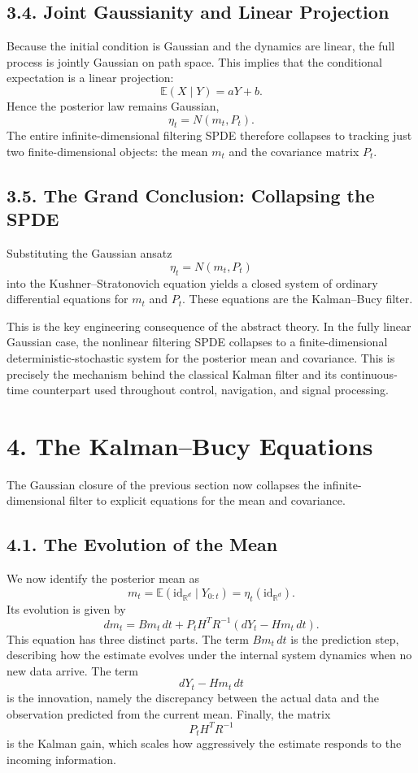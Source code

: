 \documentclass[11pt]{article}
\theoremstyle{definition}
\theoremstyle{remark}
\begin{document}
\subsection*{3.4. Joint Gaussianity and Linear Projection}
Because the initial condition is Gaussian and the dynamics are linear, the full process is jointly Gaussian on path space. This implies that the conditional expectation is a linear projection:
\[
\mathbb E(X\mid Y)=aY+b.
\]
Hence the posterior law remains Gaussian,
\[
\eta_t=N(m_t,P_t).
\]
The entire infinite-dimensional filtering SPDE therefore collapses to tracking just two finite-dimensional objects: the mean \(m_t\) and the covariance matrix \(P_t\).

\subsection*{3.5. The Grand Conclusion: Collapsing the SPDE}
Substituting the Gaussian ansatz
\[
\eta_t=N(m_t,P_t)
\]
into the Kushner--Stratonovich equation yields a closed system of ordinary differential equations for \(m_t\) and \(P_t\). These equations are the Kalman--Bucy filter.

This is the key engineering consequence of the abstract theory. In the fully linear Gaussian case, the nonlinear filtering SPDE collapses to a finite-dimensional deterministic-stochastic system for the posterior mean and covariance. This is precisely the mechanism behind the classical Kalman filter and its continuous-time counterpart used throughout control, navigation, and signal processing.

\section*{4. The Kalman--Bucy Equations}
The Gaussian closure of the previous section now collapses the infinite-dimensional filter to explicit equations for the mean and covariance.

\subsection*{4.1. The Evolution of the Mean}
We now identify the posterior mean as
\[
m_t=\mathbb E(\mathrm{id}_{\mathbb R^d}\mid Y_{0:t})=\eta_t(\mathrm{id}_{\mathbb R^d}).
\]
Its evolution is given by
\[
dm_t
=
Bm_t\,dt
+
P_tH^TR^{-1}(dY_t-Hm_t\,dt).
\]
This equation has three distinct parts. The term \(Bm_t\,dt\) is the prediction step, describing how the estimate evolves under the internal system dynamics when no new data arrive. The term
\[
dY_t-Hm_t\,dt
\]
is the innovation, namely the discrepancy between the actual data and the observation predicted from the current mean. Finally, the matrix
\[
P_tH^TR^{-1}
\]
is the Kalman gain, which scales how aggressively the estimate responds to the incoming information.
\end{document}
